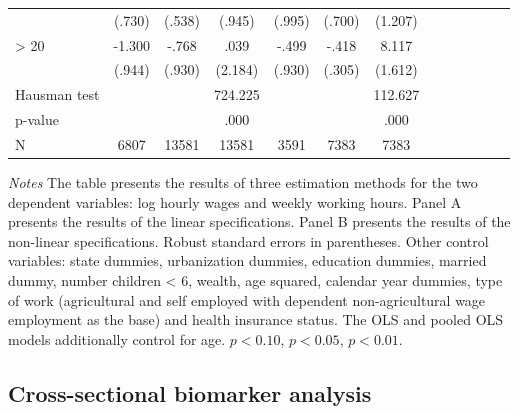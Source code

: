 \begin{table}[p]
\begin{center}
\begin{adjustbox}{max width=\linewidth}
\begin{threeparttable}
{\begin{tabular}{l*{6}{S
S}}
                &   (.730)         &   (.538)         &   (.945)         &   (.995)         &   (.700)         &  (1.207)         \\
\hspace*{10mm}> 20&  -1.300         &    -.768         &     .039         &    -.499         &    -.418         &    8.117\sym{***}\\
                &   (.944)         &   (.930)         &  (2.184)         &   (.930)         &   (.305)         &  (1.612)         \\
\midrule
Hausman test    &                  &                  &  724.225         &                  &                  &  112.627         \\
\hspace*{10mm} p-value         &                  &                  &     .000         &                  &                  &     .000         \\
N               &     6807         &    13581         &    13581         &     3591         &     7383         &     7383         \\
\bottomrule
\end{tabular}
\begin{tablenotes}
\item \footnotesize \textit{Notes} The table presents the results of three estimation methods for the two dependent variables: log hourly wages and weekly working hours. Panel A presents the results of the linear specifications. Panel B presents the results of the non-linear specifications. Robust standard errors in parentheses. Other control variables: state dummies, urbanization dummies, education dummies, married dummy, number children < 6, wealth, age squared, calendar year dummies, type of work (agricultural and self employed with dependent non-agricultural wage employment as the base) and health insurance status. The OLS and pooled OLS models additionally control for age. \sym{*} \(p<0.10\), \sym{**} \(p<0.05\), \sym{***} \(p<0.01\).
\end{tablenotes}
}
\end{threeparttable}
\end{adjustbox}
\end{center}
\end{table}


\subsection{Cross-sectional biomarker analysis}


